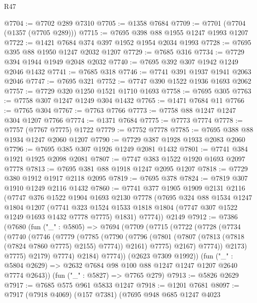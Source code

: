 \begin{lexlean}{R47}
\begin{coremodule}
@7704 := @7702 @289 @7310
@7705 := @1358 @7684
@7709 := @7701 (@7704 (@1357 (@7705 @289)))
@7715 := @7695 @398 @88 @1955 @1247 @1993 @1207
@7722 := @1421 @7684 @374 @397 @1952 @1954 @2034 @1993
@7728 := @7695 @395 @88 @1950 @1247 @2032 @1207
@7729 := @7685 @316
@7734 := @7729 @394 @1944 @1949 @2048 @2032
@7740 := @7695 @392 @307 @1942 @1249 @2046 @1432
@7741 := @7685 @318
@7746 := @7741 @391 @1937 @1941 @2063 @2046
@7747 := @7695 @321
@7752 := @7747 @390 @1522 @1936 @1693 @2062
@7757 := @7729 @320 @1250 @1521 @1710 @1693
@7758 := @7695 @305
@7763 := @7758 @307 @1247 @1249 @304 @1432
@7765 := @1471 @7684 @11
@7766 := @7765 @304
@7767 := @7763 @7766
@7773 := @7758 @88 @1247 @1247 @304 @1207 @7766
@7774 := @1371 @7684
@7775 := @7773 @7774
@7778 := @7757 (@7767 @7775) @1722
@7779 := @7752 @7778
@7785 := @7695 @388 @88 @1934 @1247 @2060 @1207
@7790 := @7729 @387 @1928 @1933 @2083 @2060
@7796 := @7695 @385 @307 @1926 @1249 @2081 @1432
@7801 := @7741 @384 @1921 @1925 @2098 @2081
@7807 := @7747 @383 @1522 @1920 @1693 @2097 @7778
@7813 := @7695 @381 @88 @1918 @1247 @2095 @1207
@7818 := @7729 @380 @1912 @1917 @2118 @2095
@7819 := @7695 @378
@7824 := @7819 @307 @1910 @1249 @2116 @1432
@7860 := @7741
    @377
    @1905
    @1909
    @2131
    @2116
    (@7747
      @376
      @1522
      @1904
      @1693
      @2130
      @7778
      (@7695
        @324
        @88
        @1534
        @1247
        @1804
        @1207
        (@7741 @323 @1524 @1533 @1818 @1804 (@7747 @307 @1522 @1249 @1693 @1432 @7778 @7775) @1831)
        @7774))
    @2149
@7912 := @7386
    (@7680
      (fun ("_" : @5805) =>
      @7694
        (@7709
          (@7715
            (@7722
              (@7728
                (@7734
                  (@7740
                    (@7746
                      (@7779
                        (@7785
                          (@7790
                            (@7796
                              (@7801 (@7807 (@7813 (@7818 (@7824 @7860 @7775) @2155) @7774)) @2161)
                              @7775)
                            @2167)
                          @7774))
                      @2173)
                    @7775)
                  @2179)
                @7774)
              @2184)
            @7774))
        (@2623 @7309 @1992))
      (fun ("_" : @5804 @2629) => @2632 @7684 @98 @100 @88 @1247 @1247 @1207 @2640 @7774 @2643))
    (fun ("_" : @5827) => @7765 @279)
@7913 := @5826 @2629
@7917 := @7685 @575 @961 @5833 @1247
@7918 := @1201 @7681
@8097 := @7917
    (@7918 @4069)
    (@157 @7381)
    (@7695
      @948
      @685
      @1247
      @4023

\end{coremodule}
\end{lexlean}
